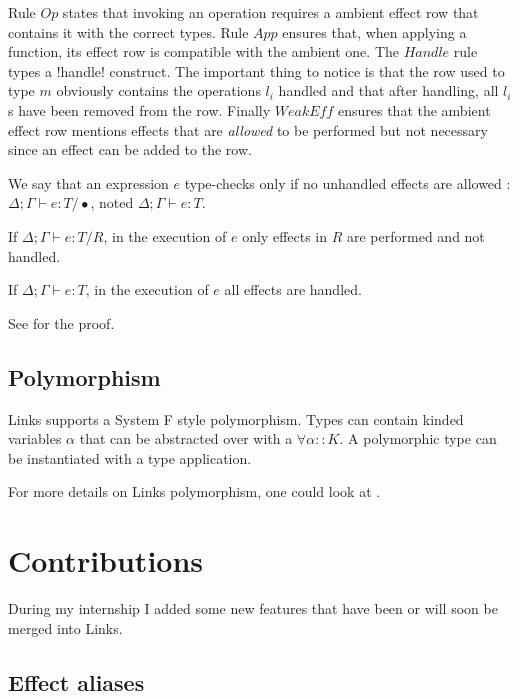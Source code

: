 \documentclass[11pt, nonacm=true, language=french, language=english]{acmart}
\begin{document}
Rule $Op$ states that invoking an operation requires a ambient effect row that contains it with the correct types. Rule $App$ ensures that, when applying a function, its effect row is compatible with the ambient one. The $Handle$ rule types a !handle! construct. The important thing to notice is that the row used to type $m$ obviously contains the operations $l_{i}$ handled and that after handling, all $l_{i}$s have been removed from the row. Finally $WeakEff$ ensures that the ambient effect row mentions effects that are \emph{allowed} to be performed but not necessary since an effect can be added to the row.

We say that an expression $e$ type-checks only if no unhandled effects are allowed : $\Delta;\Gamma \vdash e : T / \bullet$, noted $\Delta;\Gamma \vdash e : T$.


\begin{thm}
  If $\Delta;\Gamma \vdash e : T / R$, in the execution of $e$ only effects in $R$ are performed and not handled.
\end{thm}
\begin{cor}
  If $\Delta;\Gamma \vdash e : T$, in the execution of $e$ all effects are handled.
\end{cor}

See \citep{links-effect} for the proof.


\subsection{Polymorphism}

Links supports a System F \cite{proof-type-girard} style polymorphism. Types can contain kinded variables $\alpha$ that can be abstracted over with a $\forall \alpha :: K$. A polymorphic type can be instantiated with a type application.

For more details on Links polymorphism, one could look at \cite{polymorph-rpc-links}.


\section{Contributions}
\label{sec:contribution}

During my internship I added some new features that have been or will soon be merged into Links.

\subsection{Effect aliases}
\end{document}
